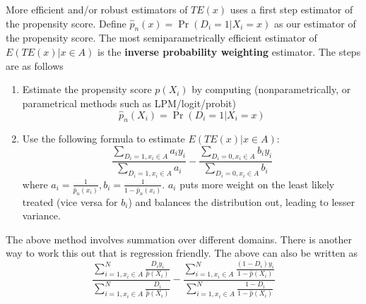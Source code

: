 \documentclass[12pt]{article}
\theoremstyle{definition}
\theoremstyle{property}
\theoremstyle{assumption}
\theoremstyle{example}
\theoremstyle{comment}
\begin{document}
More efficient and/or robust estimators of $TE(x)$ uses a first step estimator of the propensity score. Define $\hat{p}_n(x)=\Pr(D_i=1|X_i=x)$ as our estimator of the propensity score. The most semiparametrically efficient estimator of $E(TE(x)|x\in A)$ is the \textbf{inverse probability weighting} estimator.  The steps are as follows
\begin{enumerate}
\item Estimate the propensity score $p(X_i)$ by computing (nonparametrically, or parametrical methods such as LPM/logit/probit)
\[
\hat{p}_n(X_i)=\Pr(D_i=1|X_i=x)
\]
\item Use the following formula to estimate $E(TE(x)|x\in A)$: 
\[
\frac{\sum_{D_i=1,x_i\in A}a_iy_i}{\sum_{D_i=1,x_i\in A}a_i}- \frac{\sum_{D_i=0,x_i\in A}b_iy_i}{\sum_{D_i=0,x_i\in A}b_i}
\]
where $a_i=\frac{1}{\hat{p}_n(x_i)}, b_i=\frac{1}{1-\hat{p}_n(x_i)}$. $a_i$  puts more weight on the least likely treated (vice versa for $b_i$) and balances the distribution out, leading to lesser variance. 
\end{enumerate}\par 
The above method involves summation over different domains. There is another way to work this out that is regression friendly.   The above can also be written as
\[
\frac{\sum_{i=1,x_i\in A}^N\frac{D_iy_i}{\hat{p}(X_i)}}{\sum_{i=1,x_i\in A}^N\frac{D_i}{\hat{p}(X_i)}}-\frac{\sum_{i=1,x_i\in A}^N\frac{(1-D_i)y_i}{1-\hat{p}(X_i)}}{\sum_{i=1,x_i\in A}^N\frac{1-D_i}{1-\hat{p}(X_i)}}\]
\end{document}
